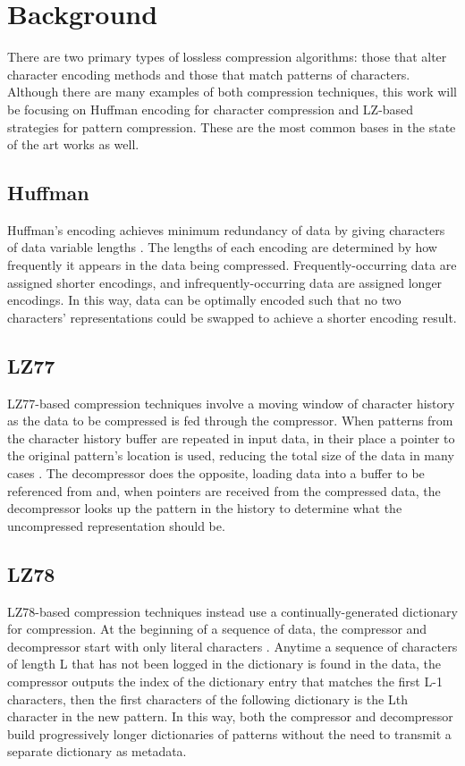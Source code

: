 \documentclass[doublespace,draft,nopageskip]{VTthesis} %
\begin{document}
\section{Background}\label{se:background}
There are two primary types of lossless compression algorithms: those that alter character encoding methods and those that match patterns of characters. Although there are many examples of both compression techniques, this work will be focusing on Huffman encoding for character compression and LZ-based strategies for pattern compression. These are the most common bases in the state of the art works as well.

\subsection{Huffman}\label{ss:huffman}
Huffman's encoding achieves minimum redundancy of data by giving characters of data variable lengths \cite{huffman}. The lengths of each encoding are determined by how frequently it appears in the data being compressed. Frequently-occurring data are assigned shorter encodings, and infrequently-occurring data are assigned longer encodings. In this way, data can be optimally encoded such that no two characters' representations could be swapped to achieve a shorter encoding result. 

\subsection{LZ77}\label{ss:lz77}
LZ77-based compression techniques involve a moving window of character history as the data to be compressed is fed through the compressor. When patterns from the character history buffer are repeated in input data, in their place a pointer to the original pattern's location is used, reducing the total size of the data in many cases \cite{lz77}. The decompressor does the opposite, loading data into a buffer to be referenced from and, when pointers are received from the compressed data, the decompressor looks up the pattern in the history to determine what the uncompressed representation should be.

\subsection{LZ78}\label{ss:lz78}
LZ78-based compression techniques instead use a continually-generated dictionary for compression. At the beginning of a sequence of data, the compressor and decompressor start with only literal characters \cite{lz78}. Anytime a sequence of characters of length L that has not been logged in the dictionary is found in the data, the compressor outputs the index of the dictionary entry that matches the first L-1 characters, then the first characters of the following dictionary is the Lth character in the new pattern. In this way, both the compressor and decompressor build progressively longer dictionaries of patterns without the need to transmit a separate dictionary as metadata.
\end{document}
